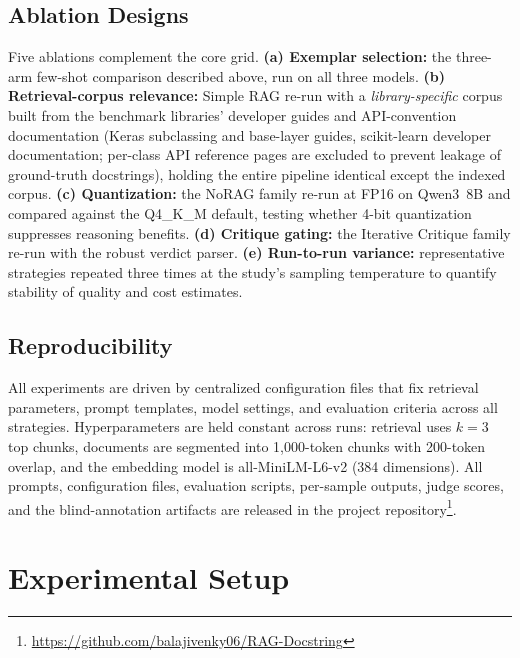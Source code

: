 \documentclass[pdflatex,sn-mathphys-ay]{sn-jnl}%
\theoremstyle{thmstyleone}%
\theoremstyle{thmstyletwo}%
\theoremstyle{thmstylethree}%
\begin{document}
{\subsection{Ablation Designs}
\label{sec:ablations-design}
Five ablations complement the core grid. \textbf{(a) Exemplar selection:} the three-arm few-shot comparison described above, run on all three models. \textbf{(b) Retrieval-corpus relevance:} Simple RAG re-run with a \emph{library-specific} corpus built from the benchmark libraries' developer guides and API-convention documentation (Keras subclassing and base-layer guides, scikit-learn developer documentation; per-class API reference pages are excluded to prevent leakage of ground-truth docstrings), holding the entire pipeline identical except the indexed corpus. \textbf{(c) Quantization:} the NoRAG family re-run at FP16 on Qwen3~8B and compared against the Q4\_K\_M default, testing whether 4-bit quantization suppresses reasoning benefits. \textbf{(d) Critique gating:} the Iterative Critique family re-run with the robust verdict parser. \textbf{(e) Run-to-run variance:} representative strategies repeated three times at the study's sampling temperature to quantify stability of quality and cost estimates.


}
\subsection{Reproducibility}
All experiments are driven by centralized configuration files that fix retrieval parameters, prompt templates, model settings, and evaluation criteria across all strategies. Hyperparameters are held constant across runs: retrieval uses $k=3$ top chunks, documents are segmented into 1,000-token chunks with 200-token overlap, and the embedding model is all-MiniLM-L6-v2 (384 dimensions). {\color{blue}
All prompts, configuration files, evaluation scripts, per-sample outputs, judge scores, and the blind-annotation artifacts are released in the project repository\footnote{\label{git}\url{https://github.com/balajivenky06/RAG-Docstring}}.
}


\section{Experimental Setup}
\label{sec:setup}
\end{document}

